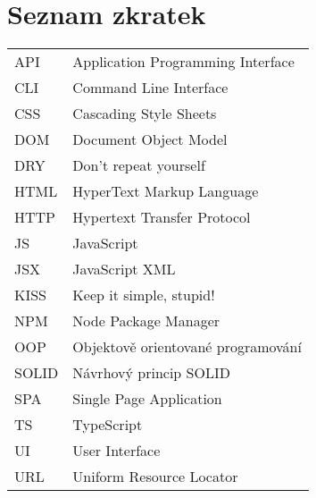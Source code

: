 \section*{Seznam zkratek}
\vspace{2em}

\noindent
\begin{tabular}{@{}ll@{}}
API	  &	Application Programming Interface\\
CLI   & Command Line Interface\\
CSS   & Cascading Style Sheets\\
DOM	  &	Document Object Model\\
DRY	  &	Don't repeat yourself\\
HTML  & HyperText Markup Language\\
HTTP  & Hypertext Transfer Protocol\\
JS    & JavaScript\\
JSX   & JavaScript XML\\
KISS	&	Keep it simple, stupid!\\
NPM   & Node Package Manager\\
OOP	  &	Objektově orientované programování\\
SOLID	&	Návrhový princip SOLID\\
SPA   & Single Page Application\\
TS    & TypeScript\\
UI    & User Interface\\
URL   & Uniform Resource Locator
\end{tabular}
